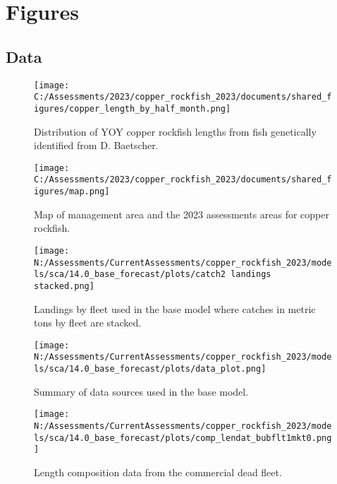 \documentclass[11pt,
  english,
  letterpaper,
]{article}
\begin{document}
\newpage

\clearpage

\hypertarget{figures}{%
\section{Figures}\label{figures}}

\hypertarget{data-1}{%
\subsection{Data}\label{data-1}}

\begin{figure}
\centering
\texttt{[image: C:/Assessments/2023/copper\_rockfish\_2023/documents/shared\_figures/copper\_length\_by\_half\_month.png]}
\caption{Distribution of YOY copper rockfish lengths from fish genetically identified from D. Baetscher.\label{fig:copper-smurf-length}}
\end{figure}

\pagebreak

\begin{figure}
\centering
\texttt{[image: C:/Assessments/2023/copper\_rockfish\_2023/documents/shared\_figures/map.png]}
\caption{Map of management area and the 2023 assessments areas for copper rockfish.\label{fig:ca-map}}
\end{figure}

\pagebreak

\begin{figure}
\centering
\texttt{[image: N:/Assessments/CurrentAssessments/copper\_rockfish\_2023/models/sca/14.0\_base\_forecast/plots/catch2 landings stacked.png]}
\caption{Landings by fleet used in the base model where catches in metric tons by fleet are stacked.\label{fig:catch}}
\end{figure}

\pagebreak

\begin{figure}
\centering
\texttt{[image: N:/Assessments/CurrentAssessments/copper\_rockfish\_2023/models/sca/14.0\_base\_forecast/plots/data\_plot.png]}
\caption{Summary of data sources used in the base model.\label{fig:data-plot}}
\end{figure}

\pagebreak

\begin{figure}
\centering
\texttt{[image: N:/Assessments/CurrentAssessments/copper\_rockfish\_2023/models/sca/14.0\_base\_forecast/plots/comp\_lendat\_bubflt1mkt0.png]}
\caption{Length composition data from the commercial dead fleet.\label{fig:com-dead-len-data}}
\end{figure}
\end{document}
